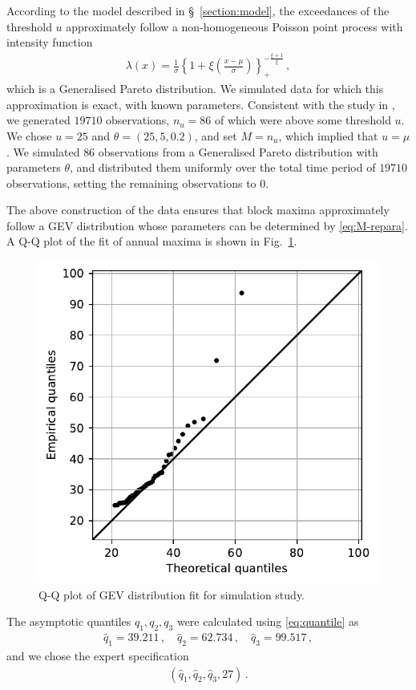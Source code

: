 \documentclass{article}
\begin{document}
%
According to the model described in \S~\ref{section:model},
the exceedances of the threshold $u$ approximately
follow a non-homogeneous Poisson point process with intensity function
%
\begin{align*}
	\lambda(x) = \frac{1}{\sigma}
		\left\{1 + \xi \left(\frac{x - \mu}{\sigma}\right)\right\}_+
		^ {-\frac{\xi + 1}{\xi}} \,,
\end{align*}
%
which is a Generalised Pareto distribution.
We simulated data for which this approximation is exact,
with known parameters.
Consistent with the study in \cite{coles1996},
we generated $19710$ observations, $n_u = 86$ of which were above
some threshold $u$. We chose $u = 25$ and $\theta = (25, 5, 0.2)$,
and set $M = n_u$, which implied that $u = \mu$.
We simulated $86$ observations from a
Generalised Pareto distribution with parameters $\theta$,
and distributed them uniformly
over the total time period of $19710$ observations,
setting the remaining observations to $0$.
%

%
The above construction of the data ensures that block maxima approximately
follow a GEV distribution whose parameters can be determined
by \eqref{eq:M-repara}.
A Q-Q plot of the fit of annual maxima is shown in Fig.~\ref{fig:ppp-qq}.
%
\begin{figure}
	\centering
	\includegraphics[width=0.55\linewidth]{plots/ppp-qq.pdf}
	\caption{Q-Q plot of GEV distribution fit for simulation study.}
	\label{fig:ppp-qq}
\end{figure}
%
The asymptotic quantiles $q_1, q_2, q_3$ were calculated
using \eqref{eq:quantile} as
%
\begin{align*}
	\hat{q}_1 = 39.211 \,,
	\quad \hat{q}_2 = 62.734 \,,
	\quad \hat{q}_3 = 99.517 \,,
\end{align*}
%
and we chose the expert specification
%
\begin{align*}
	\left(\hat{q}_1, \hat{q}_2, \hat{q}_3, 27 \right) \,.
\end{align*}
%
\end{document}
